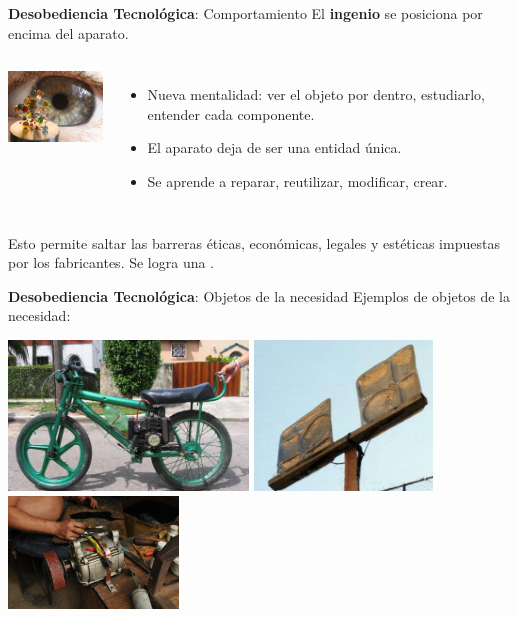 \documentclass[spanish]{beamer}
\begin{document}
\begin{frame}{\textbf{Desobediencia Tecnológica}: Comportamiento}        
    El \textbf{ingenio} se posiciona por encima del aparato.
    \vspace{0.3cm}
    \begin{columns}
            \centering
            \includegraphics[width=3.5cm]{img/complejidad.jpg}
            \begin{itemize}
                \item Nueva mentalidad: ver el objeto por dentro, estudiarlo, entender cada componente.
                \item El aparato deja de ser una entidad única.
                \item Se aprende a reparar, reutilizar, modificar, crear.
            \end{itemize}
    \end{columns}
    \vspace{0.3cm}
    Esto permite saltar las barreras éticas, económicas, legales y estéticas impuestas por los fabricantes.
    Se logra una .
\end{frame}

\begin{frame}{\textbf{Desobediencia Tecnológica}: Objetos de la necesidad}
    Ejemplos de objetos de la necesidad:
    \begin{center}            
        \includegraphics[height=4cm]{img/inventos/rikimbili.jpg}
        \includegraphics[height=4cm]{img/inventos/antena_bandejas.jpg}
        \includegraphics[height=3cm]{img/inventos/motor.jpg}        
    \end{center}
\end{frame}
\end{document}
